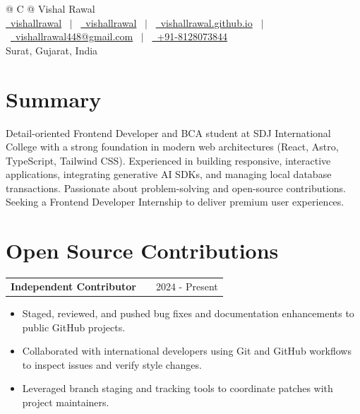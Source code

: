 \documentclass[a4paper,10pt]{article}
\makeatletter
\newenvironment{joblong}[2]
    {
    \begin{tabularx}{\linewidth}{@{}l X r@{}}
    \textbf{#1} & \hfill &  #2 \\[3.75pt]
    \end{tabularx}
    \vspace{-4pt}
    \begin{minipage}[t]{\linewidth}
    \begin{itemize}[nosep,after=\strut, leftmargin=1em, itemsep=2pt,label=--]
    }
    {
    \end{itemize}
    \end{minipage}    
    }
\makeatother
\begin{document}
\pagestyle{empty} 


\begin{tabularx}{\linewidth}{@{} C @{}}
\Huge{Vishal Rawal} \\[6pt]
\href{https://github.com/vishallrawal}{\raisebox{-0.05\height}\faGithub\ vishallrawal} \ $|$ \ 
\href{https://linkedin.com/in/vishalrawal}{\raisebox{-0.05\height}\faLinkedin\ vishallrawal} \ $|$ \ 
\href{https://vishallrawal.github.io/}{\raisebox{-0.05\height}\faGlobe \ vishallrawal.github.io} \ $|$ \ 
\href{mailto:vishalrawal448@gmail.com}{\raisebox{-0.05\height}\faEnvelope \ vishallrawal448@gmail.com} \ $|$ \ 
\href{tel:+918128073844}{\raisebox{-0.05\height}\faMobile \ +91-8128073844} \\
\small{Surat, Gujarat, India}
\end{tabularx}
\vspace{2pt}

\section{Summary}
Detail-oriented Frontend Developer and BCA student at SDJ International College with a strong foundation in modern web architectures (React, Astro, TypeScript, Tailwind CSS). Experienced in building responsive, interactive applications, integrating generative AI SDKs, and managing local database transactions. Passionate about problem-solving and open-source contributions. Seeking a Frontend Developer Internship to deliver premium user experiences.

\section{Open Source Contributions}

\begin{joblong}{Independent Contributor}{2024 - Present}
\item Staged, reviewed, and pushed bug fixes and documentation enhancements to public GitHub projects.
\item Collaborated with international developers using Git and GitHub workflows to inspect issues and verify style changes.
\item Leveraged branch staging and tracking tools to coordinate patches with project maintainers.
\end{joblong}
\end{document}
